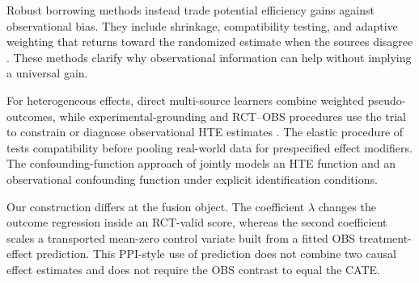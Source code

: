 Robust borrowing methods instead trade potential efficiency gains against observational bias. They include shrinkage, compatibility testing, and adaptive weighting that returns toward the randomized estimate when the sources disagree \citep{rosenman2020shrinkage,cheng2021adaptive}. These methods clarify why observational information can help without implying a universal gain.

For heterogeneous effects, direct multi-source learners combine weighted pseudo-outcomes, while experimental-grounding and RCT--OBS procedures use the trial to constrain or diagnose observational HTE estimates \citep{li2022directfusion,kallus2018removing}. The elastic procedure of \citet{yang2023elastic} tests compatibility before pooling real-world data for prespecified effect modifiers. The confounding-function approach of \citet{yang2025confounding} jointly models an HTE function and an observational confounding function under explicit identification conditions.

Our construction differs at the fusion object. The coefficient $\lambda$ changes the outcome regression inside an RCT-valid score, whereas the second coefficient scales a transported mean-zero control variate built from a fitted OBS treatment-effect prediction. This PPI-style use of prediction does not combine two causal effect estimates and does not require the OBS contrast to equal the CATE.
